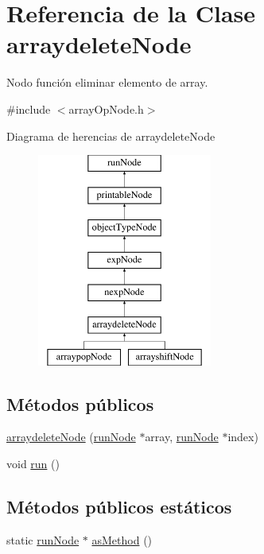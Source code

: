 \hypertarget{classarraydeleteNode}{\section{Referencia de la Clase arraydelete\-Node}
\label{classarraydeleteNode}
}


Nodo función eliminar elemento de array.  




{\ttfamily \#include $<$array\-Op\-Node.\-h$>$}

Diagrama de herencias de arraydelete\-Node\begin{figure}[H]
\begin{center}
\leavevmode
\includegraphics[height=7.000000cm]{classarraydeleteNode}
\end{center}
\end{figure}
\subsection*{Métodos públicos}
\begin{DoxyCompactItemize}
\item 
\hyperlink{classarraydeleteNode_abd17e65ebd9704157cb3f431f3dbcf97}{arraydelete\-Node} (\hyperlink{classrunNode}{run\-Node} $\ast$array, \hyperlink{classrunNode}{run\-Node} $\ast$index)
\item 
void \hyperlink{classarraydeleteNode_a0ce9f89cbb1485472f071b3573f0477d}{run} ()
\end{DoxyCompactItemize}
\subsection*{Métodos públicos estáticos}
\begin{DoxyCompactItemize}
\item 
static \hyperlink{classrunNode}{run\-Node} $\ast$ \hyperlink{classarraydeleteNode_a31ba9b73f9e6266042779eb8b8bffb01}{as\-Method} ()
\end{DoxyCompactItemize}


